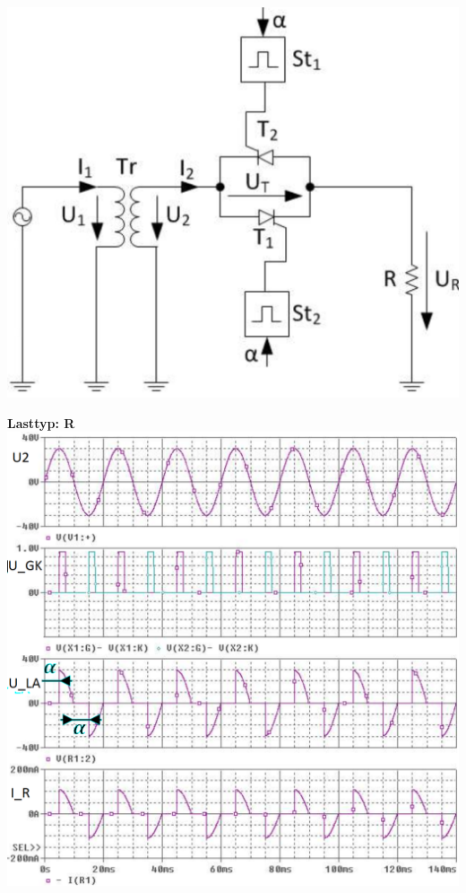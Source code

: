 \begin{minipage}{0.3\linewidth}
    \includegraphics[width=\linewidth]{images/SchemaWSSteller}
\end{minipage}
\begin{minipage}{0.3\linewidth}
    \textbf{Lasttyp: R}\newline
    \includegraphics[width=\linewidth]{images/KLWSSteller}
\end{minipage}
